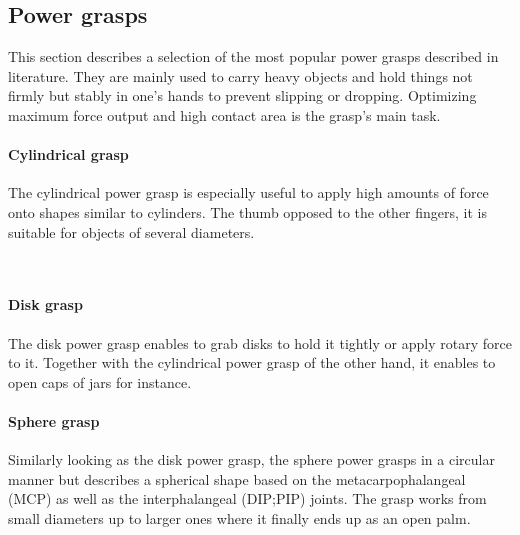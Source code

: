 \documentclass[main]{subfiles}
\begin{document}
\subsection{Power grasps}

This section describes a selection of the most popular power grasps described in literature. They are mainly used to carry heavy objects and hold things not firmly but stably in one's hands to prevent slipping or dropping. Optimizing maximum force output and high contact area is the grasp's main task.

\paragraph{Cylindrical grasp}
The cylindrical power grasp is especially useful to apply high amounts of force onto shapes similar to cylinders. The thumb opposed to the other fingers, it is suitable for objects of several diameters.

\begin{figure}[H]
\hspace{0.15\textwidth}
\hspace{0.15\textwidth}
\\
\label{cylindrical grasp}
\end{figure}

\paragraph{Disk grasp}
The disk power grasp enables to grab disks to hold it tightly or apply rotary force to it. Together with the cylindrical power grasp of the other hand, it enables to open caps of jars for instance.

\begin{figure}[H]
\label{Power-disk-grasp}
\end{figure}

\paragraph{Sphere grasp}
Similarly looking as the disk power grasp, the sphere power grasps in a circular manner but describes a spherical shape based on the metacarpophalangeal (MCP) as well as the interphalangeal (DIP;PIP) joints. The grasp works from small diameters up to larger ones where it finally ends up as an open palm.
\end{document}
